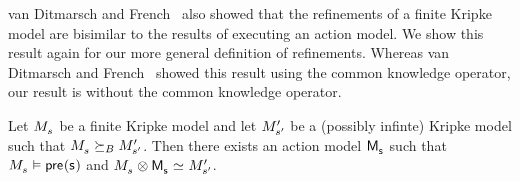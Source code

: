 van Ditmarsch and French~\cite{vanditmarsch:2009} also showed that the refinements of a finite Kripke model are bisimilar to the results of executing an action model.
We show this result again for our more general definition of refinements.
Whereas van Ditmarsch and French~\cite{vanditmarsch:2009} showed this result using the common knowledge operator, our result is without the common knowledge operator.

\begin{proposition}
Let $\kPModel{\kStateS}$ be a finite Kripke model and let ${M^{\prime}_{{s}^{\prime}}}$ be a (possibly infinte) Kripke model such that $\kPModel{\kStateS} \simulatesBs \kPModelP{\kStateSP}$.
Then there exists an action model $\aPModel{\aStateS}$ such that $\kPModel{\kStateS} \entails \aPrecondition(\aStateS)$ and $\kPModel{\kStateS} \exec \aPModel{\aStateS} \bisimilar \kPModelP{\kStateSP}$.
\end{proposition}

